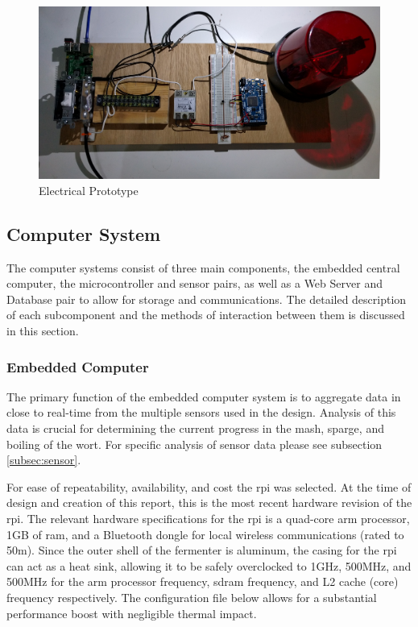 \documentclass{article}
\begin{document}
\begin{figure}[H]
\begin{center}
\includegraphics[scale=0.1]{electrical-prototype.jpg}
\caption{Electrical Prototype}
\label{fig:electrical-prototype}
\end{center}
\end{figure}

\subsection{Computer System}
The computer systems consist of three main components, the embedded central computer, the microcontroller and sensor pairs, as well as a Web Server and Database pair to allow for storage and communications.  The detailed description of each subcomponent and the methods of interaction between them is discussed in this section.
\subsubsection{Embedded Computer}
The primary function of the embedded computer system is to aggregate data in close to real-time from the multiple sensors used in the design.  Analysis of this data is crucial for determining the current progress in the \gls{mash}, \gls{sparge}, and boiling of the \gls{wort}.  For specific analysis of sensor data please see subsection \ref{subsec:sensor}.

For ease of repeatability, availability, and cost the \gls{rpi} was selected.  At the time of design and creation of this report, this is the most recent hardware revision of the \gls{rpi}.  The relevant hardware specifications for the \gls{rpi} is a quad-core \gls{arm} processor, 1GB of \gls{ram}, and a Bluetooth dongle for local wireless communications (rated to 50m).  Since the outer shell of the fermenter is aluminum, the casing for the \gls{rpi} can act as a heat sink, allowing it to be safely overclocked to 1GHz, 500MHz, and 500MHz for the \gls{arm} processor frequency, sdram frequency, and L2 cache (core) frequency respectively.  The configuration file below allows for a substantial performance boost with negligible thermal impact.  
\end{document}
